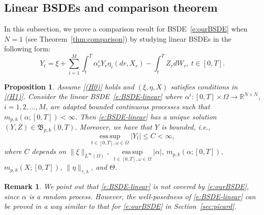 \documentclass[11pt,reqno]{amsart}
\newtheorem{remark}{Remark}[section]
\newtheorem{proposition}{Proposition}[section]
\DeclareMathOperator*{\esssup}{ess\,sup}
\numberwithin{equation}{section}
\begin{document}
\subsection{Linear BSDEs and  comparison theorem}\label{sec:Comparison}
In this subsection,  we prove a comparison result for BSDE~\eqref{e:ourBSDE} when $N=1$ (see Theorem~\ref{thm:comparison}) by studying linear BSDEs in the following form:
\begin{equation}\label{e:BSDE-linear}
Y_{t} = \xi + \sum_{i=1}^{M}\int_{t}^{T} \alpha^{i}_{r}Y_{r}\eta_{i}(dr,X_{r}) - \int_{t}^{T}Z_{r}dW_{r},\ t\in[0,T].
\end{equation}

\begin{proposition}\label{prop:exp}
Assume \ref{(H0)} holds and $(\xi,\eta,X)$ satisfies conditions in \ref{(H1)}. Consider the  linear BSDE~\eqref{e:BSDE-linear} where $\alpha^{i}:[0,T]\times\Omega\rightarrow\mathbb{R}^{N\times N}$, $ i=1,2,...,M$, are adapted \emph{bounded} continuous processes such that $m_{p,k}(\alpha;[0,T])<\infty$.  Then \eqref{e:BSDE-linear} has a unique solution $(Y,Z)\in\mathfrak{B}_{p,k}(0,T)$.  Moreover,
we have that $Y$ is bounded, i.e.,
$$
\esssup\limits_{t\in[0,T],\omega\in\Omega}|Y_{t}|\le C<\infty,
$$ 
where $C$ depends on $\|\xi\|_{L^{\infty}(\Omega)}$, $\esssup\limits_{t\in[0,T],\omega\in\Omega}|\alpha|$, $m_{p,k}(\alpha;[0,T])$, $m_{p,k}(X;[0,T])$, $\|\eta\|_{\tau, \lambda}$, and $\Theta.$
\end{proposition}

\begin{remark}\label{rem:linear BSDE & BSDE}
We point out that \eqref{e:BSDE-linear} is not covered by \eqref{e:ourBSDE}, since $\alpha$ is a random process. However, the well-posedness of \eqref{e:BSDE-linear} can be proved in a way similar to that for \eqref{e:ourBSDE} in Section~\ref{sec:picard}. 
\end{remark}
\end{document}
